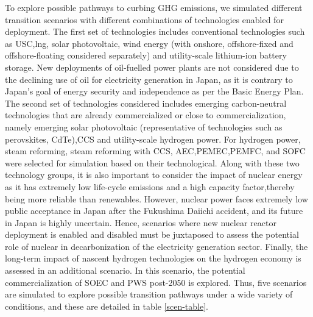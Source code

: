 To explore possible pathways to curbing \gls{GHG} emissions, we simulated different transition scenarios with different combinations of technologies enabled for deployment. The first set of technologies includes conventional technologies such as  \gls{USC},\gls{lng}, solar photovoltaic, wind energy (with onshore, offshore-fixed and offshore-floating considered separately) and utility-scale lithium-ion battery storage. New deployments of oil-fuelled power plants are not considered due to the declining use of oil for electricity generation in Japan, as it is contrary to Japan's goal of energy security and independence as per the Basic Energy Plan. The second set of technologies considered includes emerging carbon-neutral technologies that are already commercialized or close to commercialization, namely emerging solar photovoltaic (representative of technologies such as perovskites, CdTe),\gls{CCS} and utility-scale hydrogen power. For hydrogen power, steam reforming, steam reforming with \gls{CCS}, \gls{AEC},\gls{PEMEC},\gls{PEMFC}, and \gls{SOFC} were selected for simulation based on their technological. Along with these two technology groups, it is also important to consider the impact of nuclear energy as it has extremely low life-cycle emissions and a high capacity factor,thereby being more reliable than renewables. However, nuclear power faces extremely low public acceptance in Japan after the Fukushima Daiichi accident, and its future in Japan is highly uncertain. Hence, scenarios where new nuclear reactor deployment is enabled and disabled must be juxtaposed to assess the potential role of nuclear in decarbonization of the electricity generation sector. Finally, the long-term impact of nascent hydrogen technologies on the hydrogen economy is assessed in an additional scenario. In this scenario, the potential commercialization of \gls{SOEC} and \gls{PWS} post-2050 is explored. Thus, five scenarios are simulated to explore possible transition pathways under a wide variety of conditions, and these are detailed in table \ref{scen-table}.

